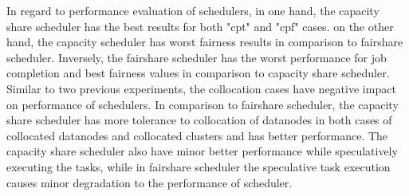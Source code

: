 In regard to performance evaluation of schedulers, in one hand, the capacity share scheduler has the best results for both "cpt" and "cpf" cases. on the other hand, the capacity scheduler has worst fairness results in comparison to fairshare scheduler. Inversely, the fairshare scheduler has the worst performance for job completion and best fairness values in comparison to capacity share scheduler. \\

Similar to two previous experiments, the collocation cases have negative impact on performance of schedulers. In comparison to fairshare scheduler, the capacity share scheduler has more tolerance to collocation of datanodes in both cases of collocated datanodes and collocated clusters and has better performance. The capacity share scheduler also have minor better performance while speculatively executing the tasks, while in fairshare scheduler the speculative task execution causes minor degradation to the performance of scheduler.  \\  
 

 



